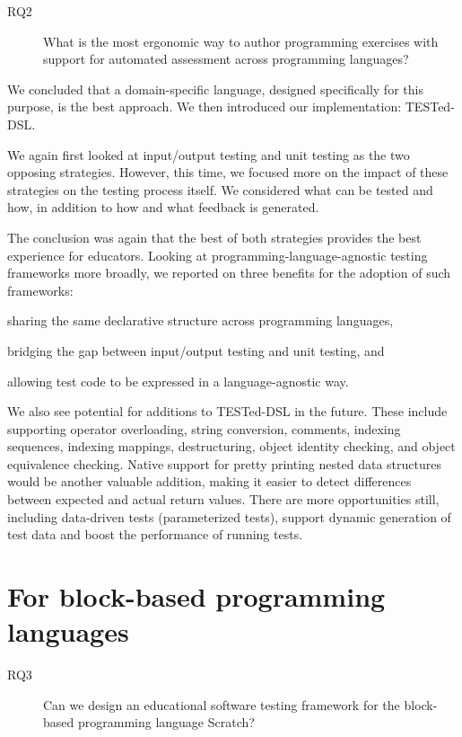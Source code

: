 \documentclass[main]{subfiles}
\begin{document}
\begin{description}
    \item[RQ2] What is the most ergonomic way to author programming exercises with support for automated assessment across programming languages?
\end{description}

We concluded that a domain-specific language, designed specifically for this purpose, is the best approach.
We then introduced our implementation: TESTed-DSL\@.

We again first looked at input/output testing and unit testing as the two opposing strategies.
However, this time, we focused more on the impact of these strategies on the testing process itself.
We considered what can be tested and how, in addition to how and what feedback is generated.

The conclusion was again that the best of both strategies provides the best experience for educators.
Looking at programming-language-agnostic testing frameworks more broadly, we reported on three benefits for the adoption of such frameworks: \begin{enumerate*}[label=\emph{\roman*})] \item sharing the same declarative structure across programming languages, \item bridging the gap between input/output testing and unit testing, and \item allowing test code to be expressed in a language-agnostic way.\end{enumerate*}

We also see potential for additions to TESTed-DSL in the future.
These include supporting operator overloading, string conversion, comments, indexing sequences, indexing mappings, destructuring, object identity checking, and object equivalence checking.
Native support for pretty printing nested data structures would be another valuable addition, making it easier to detect differences between expected and actual return values.
There are more opportunities still, including data-driven tests (parameterized tests), support dynamic generation of test data and boost the performance of running tests.

\section{For block-based programming languages}\label{sec:for-block-based-programming-languages}

\begin{description}
    \item[RQ3] Can we design an educational software testing framework for the block-based programming language Scratch?
\end{description}
\end{document}
